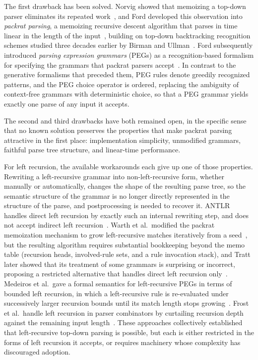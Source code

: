 \documentclass[manuscript]{acmart}
\begin{document}
The first drawback has been solved. Norvig showed that memoizing a top-down parser eliminates its repeated work~\cite{norvig1991}, and Ford developed this observation into \emph{packrat parsing}, a memoizing recursive descent algorithm that parses in time linear in the length of the input~\cite{ford2002,ford2002b}, building on top-down backtracking recognition schemes studied three decades earlier by Birman and Ullman~\cite{birman1970,birman1973}. Ford subsequently introduced \emph{parsing expression grammars} (PEGs) as a recognition-based formalism for specifying the grammars that packrat parsers accept~\cite{ford2004}. In contrast to the generative formalisms that preceded them, PEG rules denote greedily recognized patterns, and the PEG choice operator is ordered, replacing the ambiguity of context-free grammars with deterministic choice, so that a PEG grammar yields exactly one parse of any input it accepts.

The second and third drawbacks have both remained open, in the specific sense that no known solution preserves the properties that make packrat parsing attractive in the first place: implementation simplicity, unmodified grammars, faithful parse tree structure, and linear-time performance.

For left recursion, the available workarounds each give up one of those properties. Rewriting a left-recursive grammar into non-left-recursive form, whether manually or automatically, changes the shape of the resulting parse tree, so the semantic structure of the grammar is no longer directly represented in the structure of the parse, and postprocessing is needed to recover it. ANTLR handles direct left recursion by exactly such an internal rewriting step, and does not accept indirect left recursion~\cite{parr2014}. Warth et al.\ modified the packrat memoization mechanism to grow left-recursive matches iteratively from a seed~\cite{warth2008}, but the resulting algorithm requires substantial bookkeeping beyond the memo table (recursion heads, involved-rule sets, and a rule invocation stack), and Tratt later showed that its treatment of some grammars is surprising or incorrect, proposing a restricted alternative that handles direct left recursion only~\cite{tratt2010}. Medeiros et al.\ gave a formal semantics for left-recursive PEGs in terms of bounded left recursion, in which a left-recursive rule is re-evaluated under successively larger recursion bounds until its match length stops growing~\cite{medeiros2014}. Frost et al.\ handle left recursion in parser combinators by curtailing recursion depth against the remaining input length~\cite{frost2008}. These approaches collectively established that left-recursive top-down parsing is possible, but each is either restricted in the forms of left recursion it accepts, or requires machinery whose complexity has discouraged adoption.
\end{document}
